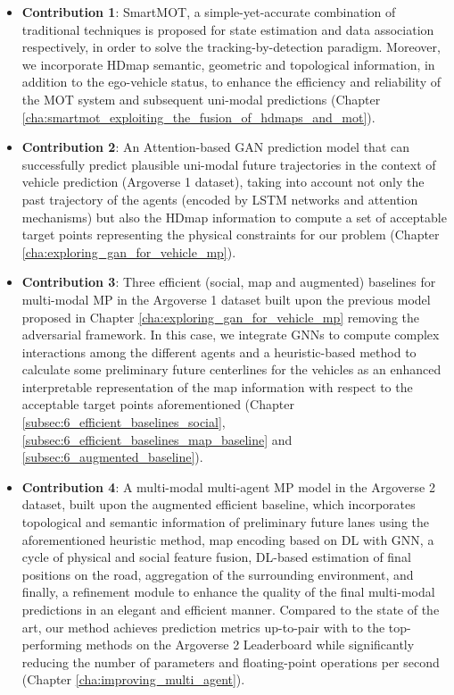 \begin{itemize}
	
	\item \textbf{Contribution 1}: SmartMOT, a simple-yet-accurate combination of traditional techniques is proposed for state estimation and data association respectively, in order to solve the tracking-by-detection paradigm. Moreover, we incorporate \ac{HDmap} semantic, geometric and topological information, in addition to the ego-vehicle status, to enhance the efficiency and reliability of the \ac{MOT} system and subsequent uni-modal predictions (Chapter \ref{cha:smartmot_exploiting_the_fusion_of_hdmaps_and_mot}).
	
	\item \textbf{Contribution 2}: An Attention-based \ac{GAN} prediction model that can successfully predict plausible uni-modal future trajectories in the context of vehicle prediction (Argoverse 1 dataset), taking into account not only the past trajectory of the agents (encoded by \ac{LSTM} networks and attention mechanisms) but also the \ac{HDmap} information to compute a set of acceptable target points representing the physical constraints for our problem (Chapter \ref{cha:exploring_gan_for_vehicle_mp}).
	
	\item \textbf{Contribution 3}: Three efficient (social, map and augmented) baselines for multi-modal \ac{MP} in the Argoverse 1 dataset built upon the previous model proposed in Chapter \ref{cha:exploring_gan_for_vehicle_mp} removing the adversarial framework. In this case, we integrate \acp{GNN} to compute complex interactions among the different agents and a heuristic-based method to calculate some preliminary future centerlines for the vehicles as an enhanced interpretable representation of the map information with respect to the acceptable target points aforementioned (Chapter \ref{subsec:6_efficient_baselines_social}, \ref{subsec:6_efficient_baselines_map_baseline} and \ref{subsec:6_augmented_baseline}). 
	
	\item \textbf{Contribution 4}: A multi-modal multi-agent \ac{MP} model in the Argoverse 2 dataset, built upon the augmented efficient baseline, which incorporates topological and semantic information of preliminary future lanes using the aforementioned heuristic method, map encoding based on \ac{DL} with \ac{GNN}, a cycle of physical and social feature fusion, \ac{DL}-based estimation of final positions on the road, aggregation of the surrounding environment, and finally, a refinement module to enhance the quality of the final multi-modal predictions in an elegant and efficient manner. Compared to the state of the art, our method achieves prediction metrics up-to-pair with to the top-performing methods on the Argoverse 2 Leaderboard while significantly reducing the number of parameters and floating-point operations per second (Chapter \ref{cha:improving_multi_agent}).
	

\end{itemize}
